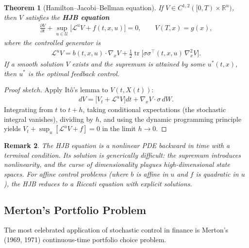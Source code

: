 \documentclass{report}
\theoremstyle{spacedplain}
\newtheorem{theorem}{Theorem}[section]
\theoremstyle{spaceddefinition}
\theoremstyle{spacedremark}
\newtheorem{remark}[theorem]{Remark}
\begin{document}
\begin{theorem}[Hamilton--Jacobi--Bellman equation]
If $V \in C^{1,2}([0,T) \times \mathbb{R}^n)$, then $V$ satisfies the
\textbf{HJB equation}
\begin{align}
    \frac{\partial V}{\partial t} + \sup_{u \in \mathcal{U}}\bigl[\mathcal{L}^u V
    + f(t,x,u)\bigr] = 0,
    \qquad V(T,x) = g(x),
\end{align}
where the controlled generator is
\begin{align}
    \mathcal{L}^u V = b(t,x,u) \cdot \nabla_x V + \frac{1}{2} \operatorname{tr}\!\bigl[\sigma\sigma^\top(t,x,u)\,\nabla^2_x V\bigr].
\end{align}
If a smooth solution $V$ exists and the supremum is attained by some $u^*(t,x)$, then $u^*$ is the optimal feedback control.
\end{theorem}
 
\begin{proof}[Proof sketch]
Apply It\^o's lemma to $V(t, X(t))$:
\begin{align}
    dV = \bigl[V_t + \mathcal{L}^u V\bigr]dt + \nabla_x V \cdot \sigma\,dW.
\end{align}
Integrating from $t$ to $t+h$, taking conditional expectations (the stochastic integral vanishes), dividing by $h$, and using the dynamic programming principle yields $V_t + \sup_u[\mathcal{L}^u V + f] = 0$ in the limit $h\to 0$.
\end{proof}
 
\begin{remark}
The HJB equation is a nonlinear PDE backward in time with a terminal condition. Its solution is generically difficult: the supremum introduces nonlinearity, and the curse of dimensionality plagues high-dimensional state spaces. For affine control problems (where $b$ is affine in $u$ and $f$ is quadratic in $u$), the HJB reduces to a Riccati equation with explicit solutions.
\end{remark}
 
\subsection{Merton's Portfolio Problem}
 
The most celebrated application of stochastic control in finance is Merton's
(1969, 1971) continuous-time portfolio choice problem.
 
\end{document}
